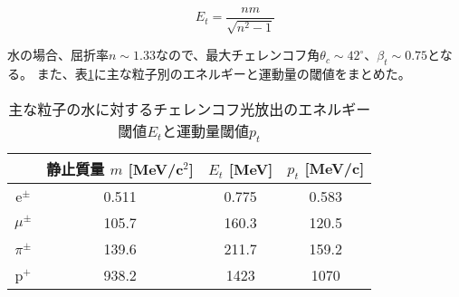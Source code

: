 \documentclass[11pt]{jreport}
\newcommand{\tabref}[1]{表\ref{#1}}
\begin{document}
%

\begin{equation}
E_{t} = \frac{nm}{\sqrt{n^{2}-1}}
\label{EnergyThreshold}
\end{equation}


水の場合、屈折率$n\sim1.33$なので、最大チェレンコフ角$\theta_{c} \sim 42^{\circ}$、$\beta_{t} \sim 0.75$となる。
また、\tabref{ThresholdByParticle}に主な粒子別のエネルギーと運動量の閾値をまとめた。


\begin{table}[htbp]
\caption[主な粒子の水に対するチェレンコフ光放出のエネルギー閾値と運動量閾値]{主な粒子の水に対するチェレンコフ光放出のエネルギー閾値$E_{t}$と運動量閾値$p_{t}$}
\begin{center}
\begin{tabular}{c|ccc}
\hline \hline
& 静止質量 $m$ [MeV/c$^{2}$] & $E_{t}$ [MeV] & $p_{t}$ [MeV/c]\\
 \hline
e$^{\pm}$	& 0.511	& 0.775 & 0.583\\
$\mu^{\pm}$	& 105.7 & 160.3 & 120.5\\
$\pi^{\pm}$	& 139.6 & 211.7 & 159.2 \\
p$^{+}$	& 938.2	& 1423 & 1070\\
\hline \hline
\end{tabular}
\end{center}
\label{ThresholdByParticle}
\end{table}%
\end{document}
